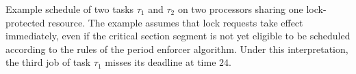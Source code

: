 Example schedule of two tasks $\tau_1$ and $\tau_2$ on two processors sharing one lock-protected resource. The example assumes that lock requests take effect immediately, even if the critical section segment is not yet eligible to be scheduled according to the rules of the period enforcer algorithm. Under this interpretation, the third job of task $\tau_1$ misses its deadline at time $24$.
  \label{fig:locking-alt2} 
  
